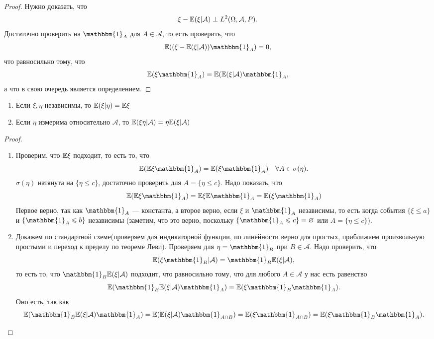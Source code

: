 \begin{proof} Нужно доказать, что
   $$\xi- \mathbb{E} (\xi | \mathcal{A} ) \perp L^2(\Omega, \mathcal{A}, P).$$ 
   Достаточно проверить на $\mathbbm{1}_A$ для $A\in\mathcal{A}$, то есть проверить, что
    $$\EE ((\xi - \EE (\xi | \mathcal{A}))\mathbbm{1}_A) = 0,$$ что равносильно тому, что
    $$\EE (\xi \mathbbm{1}_A) = \EE (\EE (\xi | \mathcal{A})\mathbbm{1}_A,$$
    а что в свою очередь является определением.
\end{proof}

\begin{theorem}
\enewline
    \begin{enumerate}
        \item Если $\xi, \eta$ независимы, то $\mathbb{E} (\xi | \eta) = \mathbb{E} \xi$
        \item Если $\eta$ измерима относительно $\mathcal{A}$, то $\mathbb{E} (\xi\eta | \mathcal{A}) = \eta \mathbb{E} (\xi | \mathcal{A})$
    \end{enumerate}
\end{theorem}


\begin{proof}
\enewline
    \begin{enumerate}
        \item Проверим, что $\mathbb{E} \xi$ подходит, то есть то, что 
        $$\EE (\EE \xi\mathbbm{1}_A) = \EE (\xi \mathbbm{1}_A) \quad \forall A\in \sigma(\eta).$$
              $\sigma(\eta)$ натянута на $\{\eta \le c\}$, достаточно проверить для $A = \{\eta \le c\}$.
              Надо показать, что
              $$\EE (\EE \xi\mathbbm{1}_A) = \EE \xi \EE \mathbbm{1}_A = \EE (\xi\mathbbm{1}_A)$$ 
              Первое верно, так как $\mathbbm{1}_A$ --- константа, а второе 
              верно, если $\xi $ и $\mathbbm{1}_A$ независимы, то есть когда события $\{\xi \le a\}$ и $\{\mathbbm{1}_A \le b\}$ независимы (заметим, что это верно, поскольку $\{\mathbbm{1}_A \le c\} = \emptyset$ или $A = \{\eta \le c\}$).

        \item Докажем по стандартной схеме(проверяем для индикаторной функции, по линейности верно для простых, приближаем произвольную простыми и переход к пределу по теореме Леви).
        Проверяем для $\eta = \mathbbm{1}_B$ при $B \in \mathcal{A}$. Надо проверить, что
              $$\EE (\xi\mathbbm{1}_B | \mathcal{A}) = \mathbbm{1}_B \EE (\xi | \mathcal{A}),$$ то есть то, что 
              $\mathbbm{1}_B \EE (\xi | \mathcal{A})$ подходит, что равносильно тому, что для любого $A\in \mathcal{A}$ у нас есть равенство
              $$\EE (\mathbbm{1}_B \EE (\xi | \mathcal{A}) \mathbbm{1}_A) = \EE (\xi \mathbbm{1}_B\mathbbm{1}_A).$$
              Оно есть, так как 
              $$\EE (\mathbbm{1}_B \EE (\xi | \mathcal{A}) \mathbbm{1}_A)  = \EE (\EE (\xi | \mathcal{A} ) \mathbbm{1}_{A\cap B}) = \EE (\xi\mathbbm{1}_{A\cap B}) = \EE (\xi \mathbbm{1}_B\mathbbm{1}_A).$$ \qedhere
    \end{enumerate}
\end{proof}
